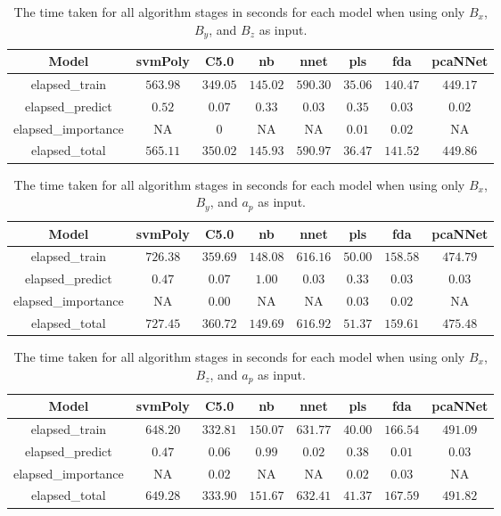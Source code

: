 \begin{table}[!ht]
	\centering
	\begin{tabular}{|c|c|c|c|c|c|c|c|}
		\hline
		Model & svmPoly & C5.0 & nb & nnet & pls & fda & pcaNNet \\ \hline
		elapsed_train & $563.98$ & $349.05$ & $145.02$ & $590.30$ & $35.06$ & $140.47$ & $449.17$ \\ \hline
		elapsed_predict & $0.52$ & $0.07$ & $0.33$ & $0.03$ & $0.35$ & $0.03$ & $0.02$ \\ \hline
		elapsed_importance & NA & $0$ & NA & NA & $0.01$ & $0.02$ & NA \\ \hline
		elapsed_total & $565.11$ & $350.02$ & $145.93$ & $590.97$ & $36.47$ & $141.52$ & $449.86$ \\ \hline
	\end{tabular}
	\caption{The time taken for all algorithm stages in seconds for each model when using only $B_{x}$, $B_{y}$, and $B_{z}$ as input.}
	\label{tab:time:reverse:coord}
\end{table}

\begin{table}[!ht]
	\centering
	\begin{tabular}{|c|c|c|c|c|c|c|c|}
		\hline
		Model & svmPoly & C5.0 & nb & nnet & pls & fda & pcaNNet \\ \hline
		elapsed_train & $726.38$ & $359.69$ & $148.08$ & $616.16$ & $50.00$ & $158.58$ & $474.79$ \\ \hline
		elapsed_predict & $0.47$ & $0.07$ & $1.00$ & $0.03$ & $0.33$ & $0.03$ & $0.03$ \\ \hline
		elapsed_importance & NA & $0.00$ & NA & NA & $0.03$ & $0.02$ & NA \\ \hline
		elapsed_total & $727.45$ & $360.72$ & $149.69$ & $616.92$ & $51.37$ & $159.61$ & $475.48$ \\ \hline
	\end{tabular}
	\caption{The time taken for all algorithm stages in seconds for each model when using only $B_{x}$, $B_{y}$, and $a_{p}$ as input.}
	\label{tab:time:reverse:xyap}
\end{table}

\begin{table}[!ht]
	\centering
	\begin{tabular}{|c|c|c|c|c|c|c|c|}
		\hline
		Model & svmPoly & C5.0 & nb & nnet & pls & fda & pcaNNet \\ \hline
		elapsed_train & $648.20$ & $332.81$ & $150.07$ & $631.77$ & $40.00$ & $166.54$ & $491.09$ \\ \hline
		elapsed_predict & $0.47$ & $0.06$ & $0.99$ & $0.02$ & $0.38$ & $0.01$ & $0.03$ \\ \hline
		elapsed_importance & NA & $0.02$ & NA & NA & $0.02$ & $0.03$ & NA \\ \hline
		elapsed_total & $649.28$ & $333.90$ & $151.67$ & $632.41$ & $41.37$ & $167.59$ & $491.82$ \\ \hline
	\end{tabular}
	\caption{The time taken for all algorithm stages in seconds for each model when using only $B_{x}$, $B_{z}$, and $a_{p}$ as input.}
	\label{tab:time:reverse:xzap}
\end{table}

